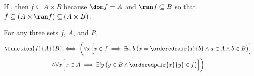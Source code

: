 \begin{cor}
    \label{thm:a-function-on-A-into-B-is-a-subset-of-the-cartesian-product-between-A-and-B}
    If , then \( f \subseteq A \times B \) because \( \dom f = A \) and \( \ran f \subseteq B \)
    so that \( f \subseteq \mleft( A \times \ran f \mright) \subseteq \mleft( A \times B \mright) \).
\end{cor}

\begin{thm}
    \label{thm:full-definition-of-the-arrow-notation}
    For any three sets \( f \), \( A \), and \( B \),
    \begin{multline*}
        \function{f}{A}{B}
        \iff
        \bigg(
        \forall x \, \Big[ x \in f \implies \exists a,b \, \big( x = \orderedpair{a}{b} \land a \in A \land b \in B \big) \Big] \\
        \land
        \forall x \, \Big[ x \in A \implies \exists! y \, \big( y \in B \land \orderedpair{x}{y} \in f \big) \Big]\bigg)
    \end{multline*}
\end{thm}

